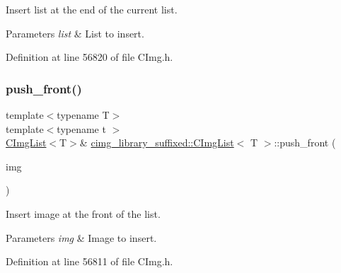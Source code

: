 Insert list at the end of the current list. 


\begin{DoxyParams}{Parameters}
{\em list} & List to insert. \\
\hline
\end{DoxyParams}


Definition at line 56820 of file C\+Img.\+h.

\mbox{\label{structcimg__library__suffixed_1_1CImgList_a7a8dcb1a1f3d1e6a8ef8537c63415933}} 
\subsubsection{\texorpdfstring{push\+\_\+front()}{push\_front()}\hspace{0.1cm}{\footnotesize\ttfamily [1/2]}}
{\footnotesize\ttfamily template$<$typename T$>$ \\
template$<$typename t $>$ \\
\hyperlink{structcimg__library__suffixed_1_1CImgList}{C\+Img\+List}$<$T$>$\& \hyperlink{structcimg__library__suffixed_1_1CImgList}{cimg\+\_\+library\+\_\+suffixed\+::\+C\+Img\+List}$<$ T $>$\+::push\+\_\+front (\begin{DoxyParamCaption}\item[{const \hyperlink{structcimg__library__suffixed_1_1CImg}{C\+Img}$<$ t $>$ \&}]{img }\end{DoxyParamCaption})\hspace{0.3cm}{\ttfamily [inline]}}



Insert image at the front of the list. 


\begin{DoxyParams}{Parameters}
{\em img} & Image to insert. \\
\hline
\end{DoxyParams}


Definition at line 56811 of file C\+Img.\+h.

\mbox{\label{structcimg__library__suffixed_1_1CImgList_a6091c1fd9d03ada9ec3ba8ed92f5bcd2}} 
